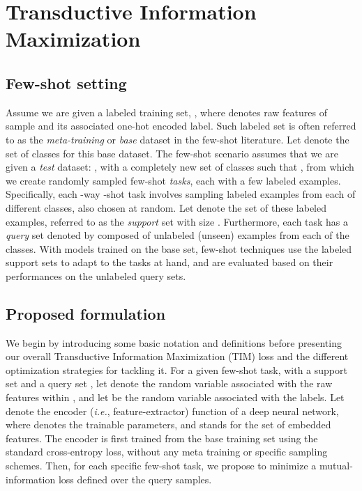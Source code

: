 \documentclass{article}
\begin{document}
 
\section{Transductive Information Maximization}

\subsection{Few-shot setting}
    	Assume we are given a labeled training set, , where 
    	 denotes raw features of sample  and  its associated one-hot encoded label. Such labeled set is often referred to as the {\em meta-training} or {\em base} dataset in the few-shot literature. Let  
    	 denote the set of classes for this base dataset. The few-shot scenario assumes that we are given a {\em test} dataset: , with a completely new set of classes  such that , from which we create randomly sampled few-shot {\em tasks}, each with a few labeled examples. 
Specifically, each -way -shot task involves sampling  labeled examples from each of  different classes, also chosen at random.
    	Let  denote the set of these labeled examples, referred to as the \textit{support} set with size   .
    	Furthermore, each task has a {\em query} set denoted by  composed of  unlabeled (unseen) examples from each of the  classes. With models trained on the base set, few-shot techniques use the labeled support sets to adapt to the tasks at hand, and are evaluated based on their performances on the unlabeled query sets.

	
	\subsection{Proposed formulation}\label{sec:formulation}
	

    	We begin by introducing some basic notation and definitions before presenting  our overall Transductive Information Maximization (TIM) loss and the different optimization strategies for tackling it. For a given few-shot task, with a support set  and a query set , let  denote the random variable associated with the raw features within , and let  be the random variable associated with the labels. Let  denote the encoder (\emph{i.e.}, feature-extractor) function of a deep neural network, where  denotes the trainable parameters, and  stands for the set of embedded features. The encoder is first trained from the base training set  using the standard cross-entropy loss, without any meta training or specific sampling schemes. Then, for each specific few-shot task, we propose to minimize a mutual-information loss defined over the query samples.
    	
\end{document}
